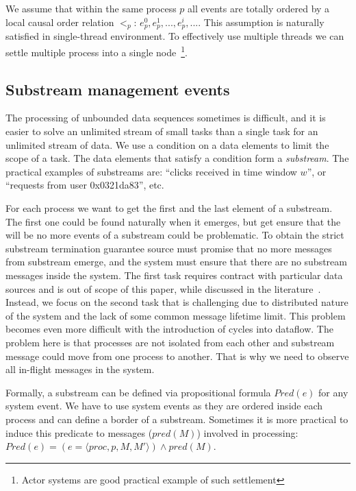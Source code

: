 We assume that within the same process $p$ all events are totally ordered by a local causal order relation $<_p$: $e^{0}_p,e^{1}_p,...,e^{i}_p,...$. This assumption is naturally satisfied in single-thread environment. To effectively use multiple threads we can settle multiple process into a single node~\footnote{Actor systems are good practical example of such settlement}.


\subsection{Substream management events}
The processing of unbounded data sequences sometimes is difficult, and it is easier to solve an unlimited stream of small tasks than a single task for an unlimited stream of data. We use a condition on a data elements to limit the scope of a task. The data elements that satisfy a condition form a {\em substream}. The practical examples of substreams are: ``clicks received in time window $w$'', or ``requests from user 0x0321da83'', etc.

For each process we want to get the first and the last element of a substream. The first one could be found naturally when it emerges, but get ensure that the will be no more events of a substream could be problematic. To obtain the strict substream termination guarantee source must promise that no more messages from substream emerge, and the system must ensure that there are no substream messages inside the system. The first task requires contract with particular data sources and is out of scope of this paper, while discussed in the literature~\cite{awad2019adaptive}. Instead, we focus on the second task that is challenging due to distributed nature of the system and the lack of some common message lifetime limit. This problem becomes even more difficult with the introduction of cycles into dataflow. The problem here is that processes are not isolated from each other and substream message could move from one process to another. That is why we need to observe all in-flight messages in the system.

Formally, a substream can be defined via propositional formula $Pred(e)$ for any system event. We have to use system events as they are ordered inside each process and can define a border of a substream. Sometimes it is more practical to induce this predicate to messages ($pred(M)$) involved in processing: $Pred(e) = (e = \langle proc, p, M, M'\rangle) \wedge pred(M)$.

